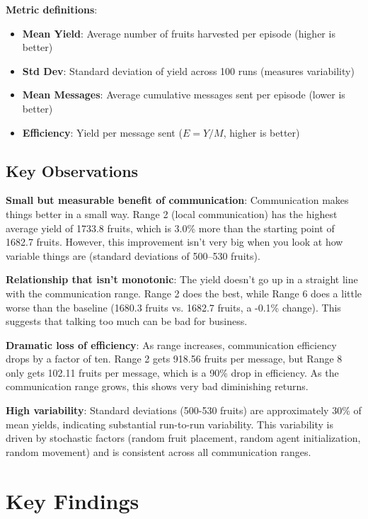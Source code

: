 \textbf{Metric definitions}:
\begin{itemize}
    \item \textbf{Mean Yield}: Average number of fruits harvested per episode (higher is better)
    \item \textbf{Std Dev}: Standard deviation of yield across 100 runs (measures variability)
    \item \textbf{Mean Messages}: Average cumulative messages sent per episode (lower is better)
    \item \textbf{Efficiency}: Yield per message sent ($E = Y / M$, higher is better)
\end{itemize}

\subsection{Key Observations}

\textbf{Small but measurable benefit of communication}: Communication makes things better in a small way. Range 2 (local communication) has the highest average yield of 1733.8 fruits, which is 3.0\% more than the starting point of 1682.7 fruits. However, this improvement isn't very big when you look at how variable things are (standard deviations of 500–530 fruits).

\textbf{Relationship that isn't monotonic}: The yield doesn't go up in a straight line with the communication range. Range 2 does the best, while Range 6 does a little worse than the baseline (1680.3 fruits vs. 1682.7 fruits, a -0.1\% change). This suggests that talking too much can be bad for business.

\textbf{Dramatic loss of efficiency}: As range increases, communication efficiency drops by a factor of ten. Range 2 gets 918.56 fruits per message, but Range 8 only gets 102.11 fruits per message, which is a 90\% drop in efficiency. As the communication range grows, this shows very bad diminishing returns.

\textbf{High variability}: Standard deviations (500-530 fruits) are approximately 30\% of mean yields, indicating substantial run-to-run variability. This variability is driven by stochastic factors (random fruit placement, random agent initialization, random movement) and is consistent across all communication ranges.

\section{Key Findings}

